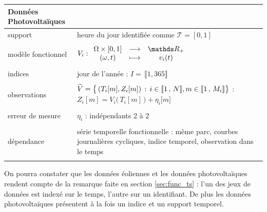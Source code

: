 \noindent\begin{tabularx}{\textwidth}{XX}
	\toprule
	\textbf{Données Photovoltaïques}                                                                                                                                                                       \\
	\midrule
	support            & heure du jour identifiée comme $\mathcal T = [0,1]$                                                                                                                               \\
	\\
	modèle fonctionnel & ${V}_i : \func {\Omega \times [0,1]} {\mathds R_+} {(\omega, t)} {v_i(t)}$                                                                                                        \\
	\\
	indices            & jour de l'année : $I = \, \llbracket 1, 365 \rrbracket$                                                                                                                           \\
	\\
	observations       & $\widehat V = \bigl\{ \, (T_i[m], Z_i[m]) \, : \, i \in \llbracket 1 \, , \, N \rrbracket, m \in \llbracket 1 \, , \, M_i \rrbracket \bigr\}$ : $Z_i[m] = V_i\bigl( \, T_i[m] \, \bigr) + \eta_i\bigl[ m \bigr]$ \\
	\\
	erreur de mesure   & $\eta_i$ : indépendants 2 à 2                                                                                                                                                     \\
	\\
	dépendance         & série temporelle fonctionnelle : même parc, courbes journalières cycliques, indice temporel, observation dans le temps                                                                               \\
	\\
	\bottomrule
\end{tabularx}

\bigskip

\begin{rem}
	On pourra constater que les données éoliennes et les données photovoltaïques rendent compte de la remarque faite en section \ref{sec:func_ts} : l'un des jeux de données est indexé sur le temps, l'autre sur un identifiant. De plus les données photovoltaïques présentent à la fois un indice et un support temporel.
\end{rem}


